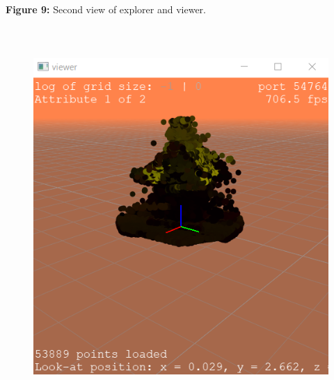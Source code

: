 \documentclass[12pt]{report}
\begin{document}

\par


\vspace{\baselineskip}

\vspace{\baselineskip}
\begin{Center}
\textbf{Figure 9: }Second view of explorer and viewer.
\end{Center}\par


\vspace{\baselineskip}



\begin{figure}[H]
	\begin{Center}
		\includegraphics[width=5.29in,height=5.67in]{./media/image7.png}
	\end{Center}
\end{figure}



\par
\end{document}
